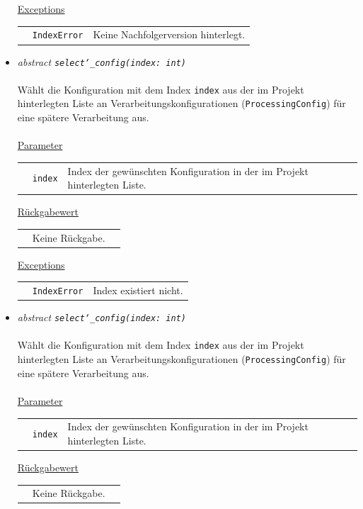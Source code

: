\documentclass{article}
\begin{document}
\begin{itemize}
\underline{Exceptions}\\
\begin{tabular}{lll}
 & \texttt{IndexError} & Keine Nachfolgerversion hinterlegt.\\
\end{tabular}


\item \textit{\flqq{}abstract\frqq} \texttt{\textit{select\char`_config(index: int)}}\\\\
Wählt die Konfiguration mit dem Index \texttt{index} aus der im Projekt hinterlegten Liste an Verarbeitungskonfigurationen (\texttt{ProcessingConfig}) für eine spätere Verarbeitung aus.
\\\\
\underline{Parameter}\\
\begin{tabular}{lll}
 & \texttt{index} & Index der gewünschten Konfiguration in der im Projekt hinterlegten Liste.
\end{tabular}

\underline{Rückgabewert}\\
\begin{tabular}{lll}
 & Keine Rückgabe.\\
\end{tabular}

\underline{Exceptions}\\
\begin{tabular}{lll}
 & \texttt{IndexError} & Index existiert nicht.\\
\end{tabular}

\item \textit{\flqq{}abstract\frqq} \texttt{\textit{select\char`_config(index: int)}}\\\\
Wählt die Konfiguration mit dem Index \texttt{index} aus der im Projekt hinterlegten Liste an Verarbeitungskonfigurationen (\texttt{ProcessingConfig}) für eine spätere Verarbeitung aus.
\\\\
\underline{Parameter}\\
\begin{tabular}{lll}
 & \texttt{index} & Index der gewünschten Konfiguration in der im Projekt hinterlegten Liste.
\end{tabular}

\underline{Rückgabewert}\\
\begin{tabular}{lll}
 & Keine Rückgabe.\\
\end{tabular}


\end{itemize}
\end{document}
